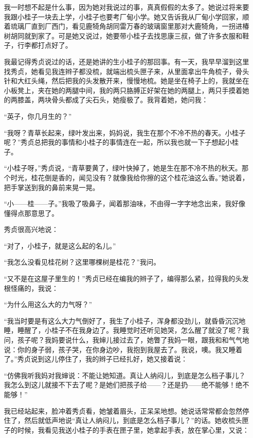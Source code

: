 \par 我一时想不起是什么事，因为她对我说过的事，真真假假的太多了。她说过将来要我跟小桂子一块去上学，小桂子也要考厂甸小学。她又告诉我从厂甸小学回家，顺着琉璃厂直到厂西门，看见鹿犄角胡同雷万春的玻璃窗里那对大鹿犄角，一拐进椿树胡同就到家了。可是她又说过，她要带小桂子去找思康三叔，做了许多衣服和鞋子，行李都打点好了。
\par 我最记得秀贞说过的话，还是她讲的生小桂子的那回事。有一天，我早早溜到这里找秀贞，她看见我连辫子都没梳，就端出梳头匣子来，从里面拿出牛角梳子，骨头针和大红头绳，然后把我的头发散开来，慢慢地梳。她是坐在椅子上的，我就坐在小板凳上，夹在她的两腿中间，我的两只胳膊正好架在她的两腿上，两只手摸着她的两膝盖，两块骨头都成了尖石头，她瘦极了。我背着她，她问我：
\par “英子，你几月生的？”
\par “我呀？青草长起来，绿叶发出来，妈妈说，我生在那个不冷不热的春天。小桂子呢？”秀贞总把我的事情和小桂子的事情连在一起，所以我也就一下子想起小桂子。
\par “小桂子呀，”秀贞说，“青草要黄了，绿叶快掉了，她是生在那不冷不热的秋天。那个时光，桂花倒是香的，闻见没有？就像我给你擦的这个桂花油这么香。”她说着，把手掌送到我的鼻前来晃一晃。
\par “小——桂——子。”我吸了吸鼻子，闻着那油味，不由得一字字地念出来，我好像懂得点那意思了。
\par 秀贞很高兴地说：
\par “对了，小桂子，就是这么起的名儿。”
\par “我怎么没看见桂花树？这里哪棵树是桂花？”我问。
\par “又不是在这屋子里生的！”秀贞已经在编我的辫子了，编得那么紧，拉得我的头发根怪痛的，我说：
\par “为什么用这么大的力气呀？”
\par “我当时要是有这么大力气倒好了，我生了小桂子，浑身都没劲儿，就昏昏沉沉地睡，睡醒了，小桂子不在我身边了。我睡觉时还听见她哭，怎么醒了就没了呢？我问，孩子呢？我妈要说什么，我婶儿接过去了，她瞥了我妈一眼，跟我和和气气地说：你的身子弱，孩子哭，在你身边吵，我抱到我屋去了。我说，噢。我又睡着了。”秀贞说到这儿停住了，我的辫子已经扎好，她又接着说：
\par “仿佛我听我妈对我婶说：不能让她知道。真让人纳闷儿，到底是怎么档子事儿？我怎么到这儿就接不下去了呢？是她们把孩子给——？还是扔——绝不能够！绝不能够！”
\par 我已经站起来，脸冲着秀贞看，她皱着眉头，正呆呆地想。她说话常常都会忽然停住了，然后就低声地说“真让人纳闷儿，到底是怎么档子事儿？”的话。她收梳头匣子的时候，我看见我送小桂子的手表在匣子里，她拿起手表，放在掌心里，又说：
